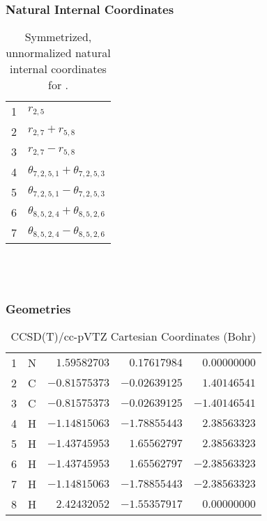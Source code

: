 \documentclass[10pt,oneside]{article}
\begin{document}
\clearpage

\subsubsection*{Natural Internal Coordinates}
\begin{table}[h!]
\centering
\caption{Symmetrized, unnormalized natural internal coordinates for .}
\small
\begin{tabular}{ll}
  1   & $r_{2,5}$ \\
  2   & $r_{2,7} + r_{5,8}$ \\
  3   & $r_{2,7} - r_{5,8}$ \\
  4   & $\theta_{7,2,5,1} + \theta_{7,2,5,3}$ \\
  5   & $\theta_{7,2,5,1} - \theta_{7,2,5,3}$ \\
  6   & $\theta_{8,5,2,4} + \theta_{8,5,2,6}$ \\
  7   & $\theta_{8,5,2,4} - \theta_{8,5,2,6}$ \\
\end{tabular}
\end{table}

\clearpage

\subsection{\ \ \ }

\subsubsection*{Geometries}
\begin{table}[h!]
\centering
\caption{CCSD(T)/cc-pVTZ Cartesian Coordinates (Bohr)}
\begin{tabular}{llrrr}
1  & N  & $ 1.59582703$ & $ 0.17617984$ & $ 0.00000000$ \\
2  & C  & $-0.81575373$ & $-0.02639125$ & $ 1.40146541$ \\
3  & C  & $-0.81575373$ & $-0.02639125$ & $-1.40146541$ \\
4  & H  & $-1.14815063$ & $-1.78855443$ & $ 2.38563323$ \\
5  & H  & $-1.43745953$ & $ 1.65562797$ & $ 2.38563323$ \\
6  & H  & $-1.43745953$ & $ 1.65562797$ & $-2.38563323$ \\
7  & H  & $-1.14815063$ & $-1.78855443$ & $-2.38563323$ \\
8  & H  & $ 2.42432052$ & $-1.55357917$ & $ 0.00000000$ \\
\end{tabular}
\end{table}
\end{document}
